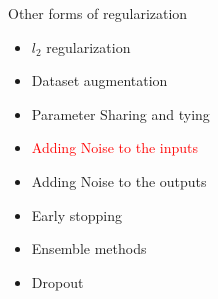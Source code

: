 \begin{frame}
\end{frame}

\begin{frame}
	\vspace{4em}
	\begin{overlayarea}{\textwidth}{\textheight}
		\begin{block}{Other forms of regularization}
			\begin{itemize}
				\item $l_2$ regularization
				\item Dataset augmentation
				\item Parameter Sharing and tying
				\item \textcolor<2->{red}{Adding Noise to the inputs }
				\item Adding Noise to the outputs 
				\item Early stopping
				\item Ensemble methods
				\item Dropout
			\end{itemize}
		\end{block}
	\end{overlayarea}
\end{frame}
			


